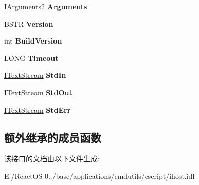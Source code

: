 \begin{DoxyCompactItemize}
\hyperlink{interface_i_host_1_1_i_arguments2}{I\+Arguments2} {\bfseries Arguments}
\item 
\mbox{\label{interface_i_host_1_1_i_host_a08f5b21ff5ab4073f8fa28fc86d6d6f4}} 
B\+S\+TR {\bfseries Version}
\item 
\mbox{\label{interface_i_host_1_1_i_host_adc9e959072df3b1ed18558095729a60d}} 
int {\bfseries Build\+Version}
\item 
\mbox{\label{interface_i_host_1_1_i_host_afdb0e28c0b8eefd7a16bd787e5af2c27}} 
L\+O\+NG {\bfseries Timeout}
\item 
\mbox{\label{interface_i_host_1_1_i_host_a6bf3a127d6e29bd9b536498ab7ce8e04}} 
\hyperlink{interface_i_host_1_1_i_text_stream}{I\+Text\+Stream} {\bfseries Std\+In}
\item 
\mbox{\label{interface_i_host_1_1_i_host_af28c12cc471775b4016b8356735f427c}} 
\hyperlink{interface_i_host_1_1_i_text_stream}{I\+Text\+Stream} {\bfseries Std\+Out}
\item 
\mbox{\label{interface_i_host_1_1_i_host_aa62d1eef4b97cc5ab1b590d0b7e7a156}} 
\hyperlink{interface_i_host_1_1_i_text_stream}{I\+Text\+Stream} {\bfseries Std\+Err}
\end{DoxyCompactItemize}
\subsection*{额外继承的成员函数}


该接口的文档由以下文件生成\+:\begin{DoxyCompactItemize}
\item 
E\+:/\+React\+O\+S-\/0../base/applications/cmdutils/cscript/ihost.\+idl\end{DoxyCompactItemize}
